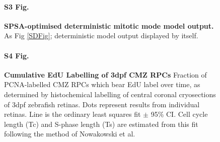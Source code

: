 \begin{figure}[p]
\paragraph{S3 Fig.}
\label{deterministicSupplement}
{\bf SPSA-optimised deterministic mitotic mode model output.} As Fig \ref{SDFig}; deterministic model output displayed by itself.
\end{figure}

\begin{figure}[h]
\paragraph{S4 Fig.}
\label{cumulativeSupplement}
{\bf Cumulative EdU Labelling of 3dpf CMZ RPCs} Fraction of PCNA-labelled CMZ RPCs which bear EdU label over time, as determined by histochemical labelling of central coronal cryosections of 3dpf zebrafish retinas. Dots represent results from individual retinas. Line is the ordinary least squares fit $\pm$ 95\% CI. Cell cycle length (Tc) and S-phase length (Ts) are estimated from this fit following the method of Nowakowski et al. \cite{Nowakowski1989}
\end{figure}